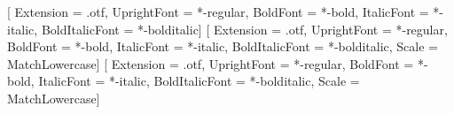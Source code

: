 %

\usepackage{fontspec}
\setmainfont{texgyrepagella}[
  Extension = .otf, UprightFont = *-regular, BoldFont = *-bold,
  ItalicFont = *-italic, BoldItalicFont = *-bolditalic]
\setsansfont{texgyreheros}[
  Extension = .otf, UprightFont = *-regular, BoldFont = *-bold,
  ItalicFont = *-italic, BoldItalicFont = *-bolditalic, Scale = MatchLowercase]
\setmonofont{texgyrecursor}[
  Extension = .otf, UprightFont = *-regular, BoldFont = *-bold,
  ItalicFont = *-italic, BoldItalicFont = *-bolditalic, Scale = MatchLowercase]
\usepackage{unicode-math}
\usepackage{microtype}

\usepackage{amsmath}
\usepackage{amsthm}
\DeclareMathOperator*{\argmin}{arg\,min}
\DeclareMathOperator*{\argmax}{arg\,max}

\theoremstyle{definition}
\newtheorem{assumption}{Assumption}[chapter]
\newtheorem{proposition}{Proposition}[chapter]
\theoremstyle{remark}
\newtheorem*{remark}{Remark}

\usepackage{graphicx}
\usepackage{booktabs}
\usepackage{longtable}
\usepackage{adjustbox}
\usepackage{caption}
\captionsetup{font=small, labelfont=bf, width=.92\linewidth}
\usepackage{float}

